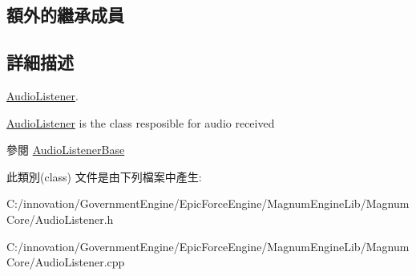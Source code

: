 \subsection*{額外的繼承成員}


\subsection{詳細描述}
\hyperlink{class_i_dream_sky_1_1_audio_listener}{Audio\+Listener}. 

\hyperlink{class_i_dream_sky_1_1_audio_listener}{Audio\+Listener} is the class resposible for audio received \begin{DoxySeeAlso}{參閱}
\hyperlink{class_i_dream_sky_1_1_audio_listener_base}{Audio\+Listener\+Base} 
\end{DoxySeeAlso}


此類別(class) 文件是由下列檔案中產生\+:\begin{DoxyCompactItemize}
\item 
C\+:/innovation/\+Government\+Engine/\+Epic\+Force\+Engine/\+Magnum\+Engine\+Lib/\+Magnum\+Core/Audio\+Listener.\+h\item 
C\+:/innovation/\+Government\+Engine/\+Epic\+Force\+Engine/\+Magnum\+Engine\+Lib/\+Magnum\+Core/Audio\+Listener.\+cpp\end{DoxyCompactItemize}

